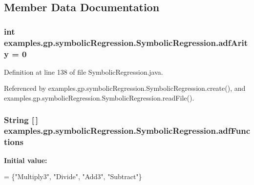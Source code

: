 \subsection{Member Data Documentation}
\hypertarget{classexamples_1_1gp_1_1symbolic_regression_1_1_symbolic_regression_a6306199eec50bb60282902256b811e0c}{
\subsubsection[{adf\-Arity}]{\setlength{\rightskip}{0pt plus 5cm}int examples.\-gp.\-symbolic\-Regression.\-Symbolic\-Regression.\-adf\-Arity = 0\hspace{0.3cm}{\ttfamily [static]}}}\label{classexamples_1_1gp_1_1symbolic_regression_1_1_symbolic_regression_a6306199eec50bb60282902256b811e0c}


Definition at line 138 of file Symbolic\-Regression.\-java.



Referenced by examples.\-gp.\-symbolic\-Regression.\-Symbolic\-Regression.\-create(), and examples.\-gp.\-symbolic\-Regression.\-Symbolic\-Regression.\-read\-File().

\hypertarget{classexamples_1_1gp_1_1symbolic_regression_1_1_symbolic_regression_a89be9b677272448c7fe4cc4d53e4570f}{
\subsubsection[{adf\-Functions}]{\setlength{\rightskip}{0pt plus 5cm}String \mbox{[}$\,$\mbox{]} examples.\-gp.\-symbolic\-Regression.\-Symbolic\-Regression.\-adf\-Functions\hspace{0.3cm}{\ttfamily [static]}}}\label{classexamples_1_1gp_1_1symbolic_regression_1_1_symbolic_regression_a89be9b677272448c7fe4cc4d53e4570f}
{\bfseries Initial value\-:}
\begin{DoxyCode}
= \{\textcolor{stringliteral}{"Multiply3"}, \textcolor{stringliteral}{"Divide"}, \textcolor{stringliteral}{"Add3"},
      \textcolor{stringliteral}{"Subtract"}\}
\end{DoxyCode}


